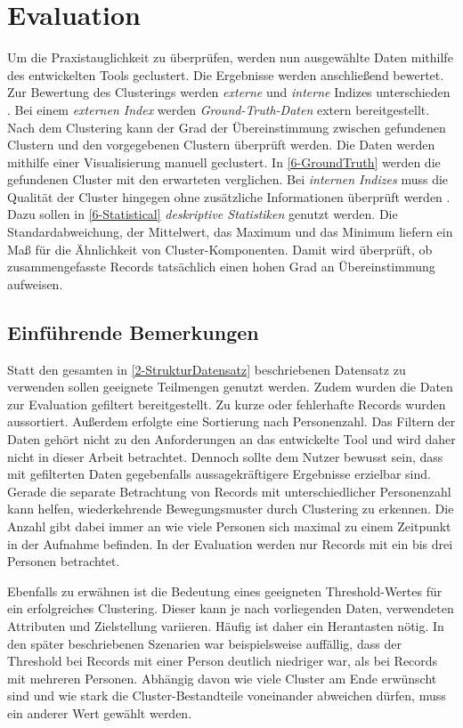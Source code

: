 \chapter{Evaluation}
\label{chapter6}
Um die Praxistauglichkeit zu überprüfen, werden nun ausgewählte Daten
mithilfe des entwickelten Tools geclustert.
Die Ergebnisse werden anschließend bewertet.
Zur Bewertung des Clusterings werden \emph{externe}
und \emph{interne} Indizes unterschieden \citep{aghabozorgi_time-series_2015, warren_liao_clustering_2005}.
Bei einem \emph{externen Index} werden \emph{Ground-Truth-Daten} extern bereitgestellt.
Nach dem Clustering kann der Grad der Übereinstimmung zwischen gefundenen Clustern
und den vorgegebenen Clustern überprüft werden.
Die Daten werden mithilfe einer Visualisierung manuell geclustert.
In \autoref{6-GroundTruth} werden die gefundenen Cluster mit den erwarteten verglichen.
Bei \emph{internen Indizes} muss die Qualität der Cluster hingegen
ohne zusätzliche Informationen überprüft werden \citep{aghabozorgi_time-series_2015, warren_liao_clustering_2005}.
Dazu sollen in \autoref{6-Statistical} \emph{deskriptive Statistiken} genutzt werden.
Die Standardabweichung, der Mittelwert, das Maximum und das Minimum liefern
ein Maß für die Ähnlichkeit von Cluster-Komponenten.
Damit wird überprüft,
ob zusammengefasste Records tatsächlich einen hohen Grad an Übereinstimmung aufweisen.

\section{Einführende Bemerkungen}
\label{6-Bemerkungen}
Statt den gesamten in \autoref{2-StrukturDatensatz} beschriebenen Datensatz zu verwenden
sollen geeignete Teilmengen genutzt werden.
Zudem wurden die Daten zur Evaluation gefiltert bereitgestellt.
Zu kurze oder fehlerhafte Records wurden aussortiert.
Außerdem erfolgte eine Sortierung nach Personenzahl.
Das Filtern der Daten gehört nicht zu den Anforderungen an das entwickelte Tool
und wird daher nicht in dieser Arbeit betrachtet.
Dennoch sollte dem Nutzer bewusst sein,
dass mit gefilterten Daten gegebenfalls aussagekräftigere Ergebnisse erzielbar sind.
Gerade die separate Betrachtung von Records mit unterschiedlicher Personenzahl kann helfen,
wiederkehrende Bewegungsmuster durch Clustering zu erkennen.
Die Anzahl gibt dabei immer an wie viele Personen sich maximal
zu einem Zeitpunkt in der Aufnahme befinden.
In der Evaluation werden nur Records mit ein bis drei Personen betrachtet.

Ebenfalls zu erwähnen ist die Bedeutung eines geeigneten Threshold-Wertes für ein erfolgreiches Clustering.
Dieser kann je nach vorliegenden Daten, verwendeten Attributen und Zielstellung variieren.
Häufig ist daher ein {\glqq Herantasten\grqq} nötig.
In den später beschriebenen Szenarien war beispielsweise auffällig,
dass der Threshold bei Records mit einer Person deutlich niedriger war,
als bei Records mit mehreren Personen.
Abhängig davon wie viele Cluster am Ende erwünscht sind
und wie stark die Cluster-Bestandteile voneinander abweichen dürfen,
muss ein anderer Wert gewählt werden.

